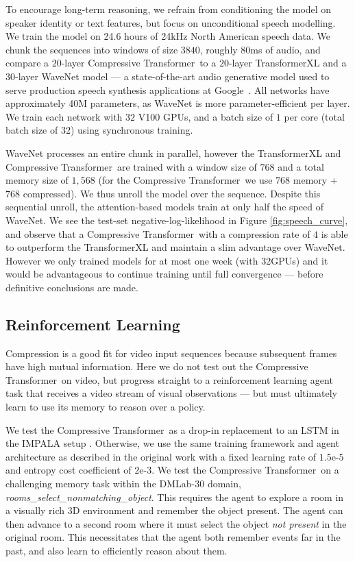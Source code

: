 To encourage long-term reasoning, we refrain from conditioning the model on speaker identity or text features, but focus on unconditional speech modelling. We train the model on 24.6 hours of 24kHz North American speech data. We chunk the sequences into windows of size $3840$, roughly $80$ms of audio, and compare a $20$-layer Compressive Transformer~to a $20$-layer TransformerXL and a $30$-layer WaveNet model \citep{oord2016wavenet} --- a state-of-the-art audio generative model used to serve production speech synthesis applications at Google~\citep{oord2018parallel}. All networks have approximately 40M parameters, as WaveNet is more parameter-efficient per layer. We train each network with $32$ V100 GPUs, and a batch size of $1$ per core (total batch size of $32$) using synchronous training.

WaveNet processes an entire chunk in parallel, however the TransformerXL and Compressive Transformer~are trained with a window size of $768$ and a total memory size of $1,568$ (for the Compressive Transformer~we use $768$ memory + $768$ compressed). We thus unroll the model over the sequence. Despite this sequential unroll, the attention-based models train at only half the speed of WaveNet. We see the test-set  negative-log-likelihood in Figure \ref{fig:speech_curve}, and observe that a Compressive Transformer~with a compression rate of $4$ is able to outperform the TransformerXL and maintain a slim advantage over WaveNet. However we only trained models for at most one week (with 32GPUs) and it would be advantageous to continue training until full convergence --- before definitive conclusions are made. 
\subsection{Reinforcement Learning} Compression is a good fit for video input sequences because subsequent frames have high mutual information. Here we do not test out the Compressive Transformer~on video, but progress straight to a reinforcement learning agent task that receives a video stream of visual observations --- but must ultimately learn to use its memory to reason over a policy.

We test the Compressive Transformer~as a drop-in replacement to an LSTM in the IMPALA setup \citep{espeholt2018impala}. Otherwise, we use the same training framework and agent architecture as described in the original work with a fixed learning rate of $1.5\text{e-}5$ and entropy cost coefficient of $2\text{e-}3$. 
We test the Compressive Transformer~on a challenging memory task within the DMLab-30 \citep{beattiedm2016} domain, \textit{rooms\_select\_nonmatching\_object}. This requires the agent to explore a room in a visually rich 3D environment and remember the object present. The agent can then advance to a second room where it must select the object \emph{not present} in the original room. This necessitates that the agent both remember events far in the past, and also learn to efficiently reason about them.

